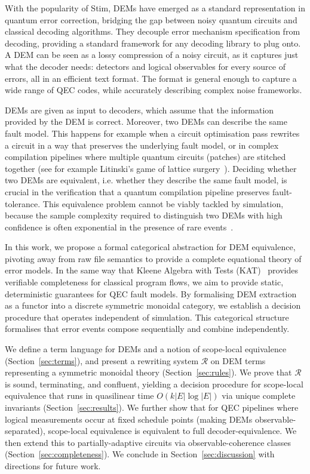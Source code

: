 \documentclass[11pt,a4paper]{article}
\newcommand{\R}{\mathcal{R}}          %
\begin{document}
With the popularity of Stim, DEMs have emerged as a standard representation in quantum error correction, bridging the gap between noisy quantum circuits and classical decoding algorithms. They decouple error mechanism specification from decoding, providing a standard framework for any decoding library to plug onto. A DEM can be seen as a lossy compression of a noisy circuit, as it captures just what the decoder needs: detectors and logical observables for every source of errors, all in an efficient text format. The format is general enough to capture a wide range of QEC codes, while accurately describing complex noise frameworks.

DEMs are given as input to decoders, which assume that the information provided by the DEM is correct. Moreover, two DEMs can describe the same fault model. This happens for example when a circuit optimisation pass rewrites a circuit in a way that preserves the underlying fault model, or in complex compilation pipelines where multiple quantum circuits (patches) are stitched together (see for example Litinski's game of lattice surgery~\cite{litinski2019lattice}). Deciding whether two DEMs are equivalent, i.e. whether they describe the same fault model, is crucial in the verification that a quantum compilation pipeline preserves fault-tolerance. This equivalence problem cannot be viably tackled by simulation, because the sample complexity required to distinguish two DEMs with high confidence is often exponential in the presence of rare events~\cite{takou2025estimatingdecodingcoherenterrors}. 

In this work, we propose a formal categorical abstraction for DEM equivalence, pivoting away from raw file semantics to provide a complete equational theory of error models. In the same way that Kleene Algebra with Tests (KAT)~\cite{kozen1997kleene} provides verifiable completeness for classical program flows, we aim to provide static, deterministic guarantees for QEC fault models. By formalising DEM extraction as a functor into a discrete symmetric monoidal category, we establish a decision procedure that operates independent of simulation. This categorical structure formalises that error events compose sequentially and combine independently.

We define a term language for DEMs and a notion of scope-local equivalence (Section~\ref{sec:terms}), and present a rewriting system $\R$ on DEM terms representing a symmetric monoidal theory (Section~\ref{sec:rules}). We prove that $\R$ is sound, terminating, and confluent, yielding a decision procedure for scope-local equivalence that runs in quasilinear time $O(k|E|\log|E|)$ via unique complete invariants (Section~\ref{sec:results}). We further show that for QEC pipelines where logical measurements occur at fixed schedule points (making DEMs observable-separated), scope-local equivalence is equivalent to full decoder-equivalence. We then extend this to partially-adaptive circuits via observable-coherence classes (Section~\ref{sec:completeness}). We conclude in Section~\ref{sec:discussion} with directions for future work.
\end{document}
